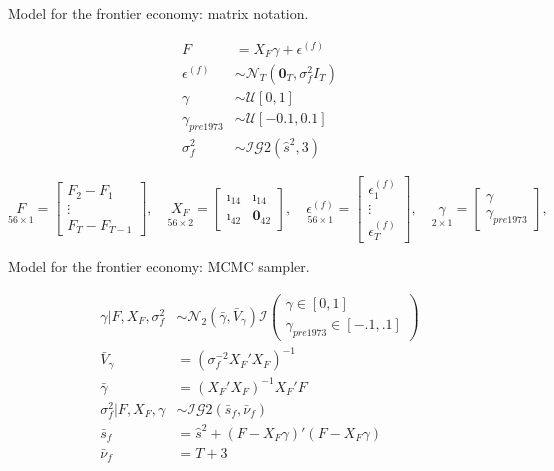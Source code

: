 \documentclass[notes,blackandwhite,mathsans,usenames,dvipsnames]{beamer}
\begin{document}
\begin{frame}{Model for the frontier economy: matrix notation.}

\begin{align*}
F &= X_F \gamma + \epsilon^{(f)}\\
\epsilon^{(f)} &\sim\mathcal{N}_T\left( \mathbf{0}_T,\sigma_f^2I_T \right)\\[2ex]
\gamma &\sim\mathcal{U}[0,1]\\
\gamma_{pre 1973} &\sim\mathcal{U}[-0.1,0.1]\\
\sigma_f^2 &\sim\mathcal{IG}2(\hat{s}^2,3)
\end{align*}

\footnotesize
$$
\underset{56\times1}{F}=\begin{bmatrix} F_2-F_1\\ \vdots \\ F_T-F_{T-1} \end{bmatrix},\quad
\underset{56\times2}{X_F}=\begin{bmatrix} \imath_{14} & \imath_{14}\\  \imath_{42} & \mathbf{0}_{42}  \end{bmatrix},\quad
\underset{56\times1}{\epsilon^{(f)}}=\begin{bmatrix} \epsilon^{(f)}_1\\ \vdots \\ \epsilon^{(f)}_T \end{bmatrix},\quad
\underset{2\times1}{\gamma}=\begin{bmatrix} \gamma  \\ \gamma_{pre1973} \end{bmatrix},\quad
$$

\end{frame}




\begin{frame}{Model for the frontier economy: MCMC sampler.}

\begin{align*}
\gamma|F, X_F,\sigma_f^2 &\sim\mathcal{N}_2\left( \bar{\gamma}, \bar{V}_{\gamma} \right)\mathcal{I}\left(\begin{array}{c}\gamma\in [0,1]\\ \gamma_{pre1973}\in[-.1,.1]\end{array}\right)\\[1ex]
\bar{V}_{\gamma} &= \left( \sigma_f^{-2}X_F'X_F \right)^{-1} \\
\bar{\gamma}&= \left( X_F'X_F \right)^{-1}X_F' F \\[2ex]
\sigma_f^2|F, X_F,\gamma &\sim\mathcal{IG}2\left( \bar{s}_f, \bar{\nu}_f \right)\\[1ex]
\bar{s}_f &= \hat{s}^2 + (F-X_F \gamma)'(F-X_F \gamma) \\
\bar{\nu}_f &= T+3
\end{align*}

\end{frame}
\end{document}
